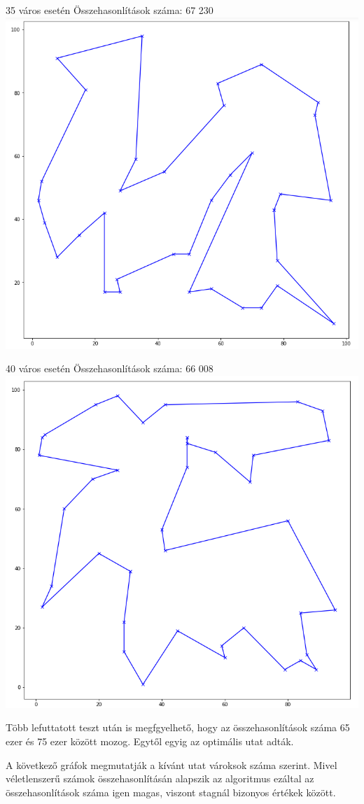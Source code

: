 35 város esetén
Összehasonlítások száma: 67 230
\includegraphics[scale=0.4]{images/35.png}

40 város esetén
Összehasonlítások száma: 66 008
\includegraphics[scale=0.4]{images/40.png}


Több lefuttatott teszt után is megfgyelhető, hogy az összehasonlítások száma 65 ezer és 75 ezer között mozog. Egytől egyig az optimális utat adták.

A következő gráfok megmutatják a kívánt utat vároksok száma szerint. Mivel véletlenszerű számok összehasonlításán alapszik az algoritmus ezáltal az összehasonlítások száma igen magas, viszont stagnál bizonyos értékek között.
